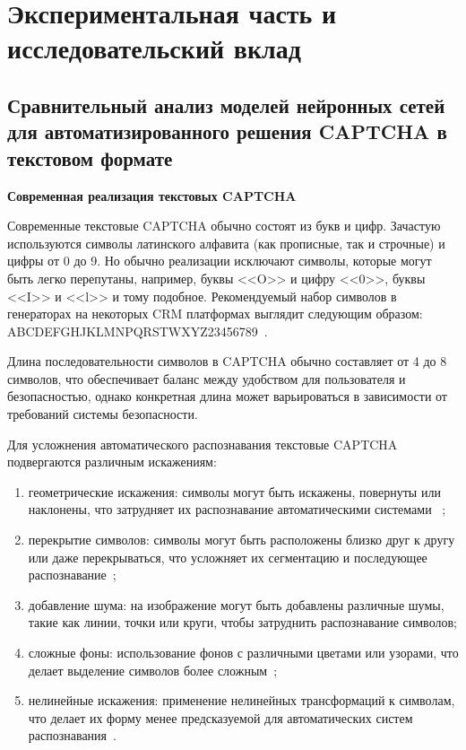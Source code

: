 \chapter{Экспериментальная часть и исследовательский вклад}

\section{Сравнительный анализ моделей нейронных сетей для автоматизированного решения CAPTCHA в текстовом формате}

\textbf{Современная реализация текстовых CAPTCHA}

Современные текстовые CAPTCHA обычно состоят из букв и цифр. Зачастую 
используются символы латинского алфавита (как прописные, так и строчные) и цифры 
от 0 до 9. Но обычно реализации исключают символы, которые могут быть легко 
перепутаны, например, буквы <<O>> и цифру <<0>>, буквы <<I>> и <<l>> и тому 
подобное. Рекомендуемый набор символов в генераторах на некоторых CRM платформах 
выглядит следующим образом: ABCDEFGHJKLMNPQRSTWXYZ23456789~\cite{Bitrix}.

Длина последовательности символов в CAPTCHA обычно составляет от 4 до 8 символов, 
что обеспечивает баланс между удобством для пользователя и безопасностью, однако 
конкретная длина может варьироваться в зависимости от требований системы 
безопасности.

Для усложнения автоматического распознавания текстовые CAPTCHA подвергаются 
различным искажениям:
\begin{enumerate}
    \item геометрические искажения: символы могут быть искажены, повернуты или 
    наклонены, что затрудняет их распознавание автоматическими системами~
    \cite{BrightData};
    \item перекрытие символов: символы могут быть расположены близко друг к 
    другу или даже перекрываться, что усложняет их сегментацию и последующее 
    распознавание~\cite{Proglib};
    \item добавление шума: на изображение могут быть добавлены различные шумы, 
    такие как линии, точки или круги, чтобы затруднить распознавание символов;
    \item сложные фоны: использование фонов с различными цветами или узорами, 
    что делает выделение символов более сложным~\cite{NVJournal};
    \item нелинейные искажения: применение нелинейных трансформаций к символам, 
    что делает их форму менее предсказуемой для автоматических систем 
    распознавания~\cite{Simai}.
\end{enumerate}

